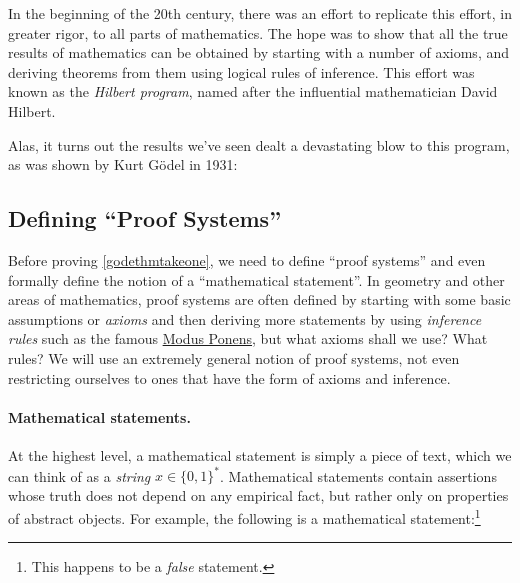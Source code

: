 In the beginning of the 20th century, there was an effort to replicate
this effort, in greater rigor, to all parts of mathematics. The hope was
to show that all the true results of mathematics can be obtained by
starting with a number of axioms, and deriving theorems from them using
logical rules of inference. This effort was known as the \emph{Hilbert
program}, named after the influential mathematician David Hilbert.

Alas, it turns out the results we've seen dealt a devastating blow to
this program, as was shown by Kurt Gödel in 1931:

\hypertarget{godethmtakeone}{}

\subsection{Defining ``Proof Systems''}\label{godelproofsystemssec}

Before proving \cref{godethmtakeone}, we need to define ``proof
systems'' and even formally define the notion of a ``mathematical
statement''. In geometry and other areas of mathematics, proof systems
are often defined by starting with some basic assumptions or
\emph{axioms} and then deriving more statements by using \emph{inference
rules} such as the famous
\href{https://en.wikipedia.org/wiki/Modus_ponens}{Modus Ponens}, but
what axioms shall we use? What rules? We will use an extremely general
notion of proof systems, not even restricting ourselves to ones that
have the form of axioms and inference.

\paragraph{Mathematical statements.} At the highest level, a
mathematical statement is simply a piece of text, which we can think of
as a \emph{string} \(x\in \{0,1\}^*\). Mathematical statements contain
assertions whose truth does not depend on any empirical fact, but rather
only on properties of abstract objects. For example, the following is a
mathematical statement:\footnote{This happens to be a \emph{false}
  statement.}

